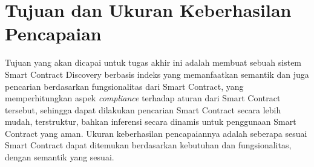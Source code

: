 


\section{Tujuan dan Ukuran Keberhasilan Pencapaian}
\label{sec:tujuan-ukuran-keberhasilan-pencapaian}


Tujuan yang akan dicapai untuk tugas akhir ini adalah membuat sebuah sistem Smart Contract Discovery berbasis indeks yang memanfaatkan semantik dan juga pencarian berdasarkan fungsionalitas dari Smart Contract, yang memperhitungkan aspek \textit{compliance} terhadap aturan dari Smart Contract tersebut, sehingga dapat dilakukan pencarian Smart Contract secara lebih mudah, terstruktur, bahkan inferensi secara dinamis untuk penggunaan Smart Contract yang aman. Ukuran keberhasilan pencapaiannya adalah seberapa sesuai Smart Contract dapat ditemukan berdasarkan kebutuhan dan fungsionalitas, dengan semantik yang sesuai.

